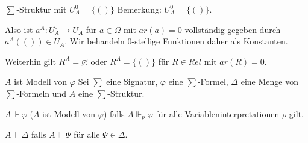 \documentclass[avery5371]{flashcards}
\begin{document}
\begin{flashcard}[ Prädikatenlogik ]{ $\sum$-Struktur mit $U_A^0=\{()\}$}
    Bemerkung: $U_A^0=\{()\}$.
    \begin{itemize*}
        \item Also ist $a^A:U_A^0\rightarrow U_A$ für $a\in\Omega$ mit $ar(a)=0$ vollständig gegeben durch $a^A(())\in U_A$. Wir behandeln 0-stellige Funktionen daher als Konstanten.
        \item Weiterhin gilt $R^A=\varnothing$ oder $R^A=\{()\}$ für $R\in Rel$ mit $ar(R)=0$.
    \end{itemize*}
\end{flashcard}

\begin{flashcard}[ Prädikatenlogik ]{ $A$ ist Modell von $\varphi$ }
    Sei $\sum$ eine Signatur, $\varphi$ eine $\sum$-Formel, $\Delta$ eine Menge von $\sum$-Formeln und $A$ eine $\sum$-Struktur.
    \begin{itemize*}
        \item $A\Vdash\varphi$ ($A$ ist Modell von $\varphi$) falls $A\Vdash_p\varphi$ für alle Variableninterpretationen $\rho$ gilt.
        \item $A\Vdash\Delta$ falls $A\Vdash\Psi$ für alle $\Psi\in\Delta$.
    \end{itemize*}
\end{flashcard}
\end{document}
